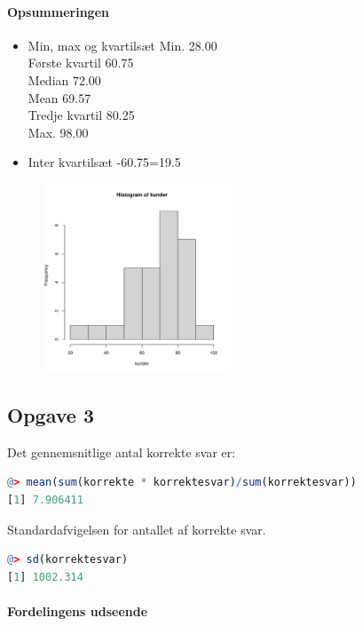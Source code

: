 \documentclass{article}
\begin{document}
\paragraph{Opsummeringen}
\begin{itemize}
  \item Min, max og kvartilsæt
  \subitem Min. 28.00 \\
    Første kvartil 60.75 \\
    Median  72.00 \\
    Mean 69.57 \\  
    Tredje kvartil 80.25 \\ 
    Max.  98.00                                                 
  \item Inter kvartilsæt
    -60.75=19.5
\end{itemize}

\begin{figure}[H] 
  \centering
  \includegraphics[width=0.5\textwidth]{../velser/uge37/R/opg2plot.pdf}
\end{figure}

\subsection{Opgave 3}
Det gennemsnitlige antal korrekte svar er: 
\begin{lstlisting}[language=R]
@> mean(sum(korrekte * korrektesvar)/sum(korrektesvar))
[1] 7.906411
\end{lstlisting}
Standardafvigelsen for antallet af korrekte svar.
\begin{lstlisting}[language=R]
@> sd(korrektesvar)
[1] 1002.314
\end{lstlisting}

\paragraph{Fordelingens udseende}
\end{document}
